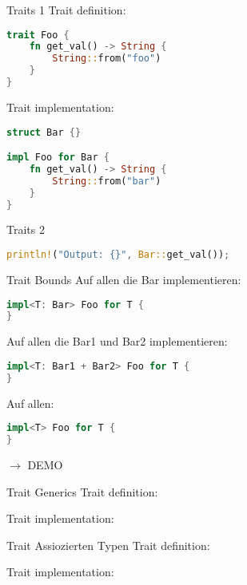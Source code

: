 
\begin{frame}[fragile,t]{Traits 1}
    Trait definition:
    \begin{lstlisting}[language=Rust,escapechar=@,label={lst:traits1}]
trait Foo {
    fn get_val() -> String {
        String::from("foo")
    }
}\end{lstlisting}

    \pause
    Trait implementation:
    \begin{lstlisting}[language=Rust,escapechar=@,label={lst:traits2}]
struct Bar {}

impl Foo for Bar {
    fn get_val() -> String {
        String::from("bar")
    }
}\end{lstlisting}

\end{frame}

\begin{frame}[fragile,t]{Traits 2}
    \begin{lstlisting}[language=Rust,escapechar=@,label={lst:traits3}]
println!("Output: {}", Bar::get_val());
\end{lstlisting}

    \pause
\end{frame}

\begin{frame}[fragile,t]{Trait Bounds}
    Auf allen die Bar implementieren:
    \begin{lstlisting}[language=Rust,escapechar=@,label={lst:traitbounds1}]
impl<T: Bar> Foo for T {
}\end{lstlisting}

    \pause Auf allen die Bar1 und Bar2 implementieren:
    \begin{lstlisting}[language=Rust,escapechar=@,label={lst:traitbounds2}]
impl<T: Bar1 + Bar2> Foo for T {
}\end{lstlisting}

    \pause Auf allen:
    \begin{lstlisting}[language=Rust,escapechar=@,label={lst:traitbounds3}]
impl<T> Foo for T {
}\end{lstlisting}

    \pause
    $\longrightarrow$ DEMO
\end{frame}

\begin{frame}[fragile,t]{Trait Generics}
    Trait definition:

    \pause
    Trait implementation:
\end{frame}

\begin{frame}[fragile,t]{Trait Assiozierten Typen}
    Trait definition:

    \pause
    Trait implementation:
\end{frame}
